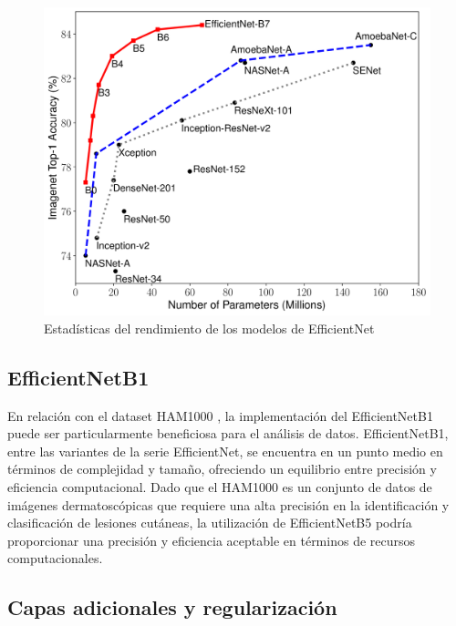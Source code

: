 \begin{figure}[ht]%
   \begin{center}
   \includegraphics[width=1\textwidth]{./Graphics/efficientnet_performance.png}
   \caption{Estadísticas del rendimiento de los modelos de EfficientNet}
   \label{fig:efficientnet_performance}
   \end{center}
   \end{figure}

\subsection{EfficientNetB1}

En relación con el dataset HAM1000 , la implementación del EfficientNetB1 puede ser particularmente beneficiosa para el análisis de datos. EfficientNetB1, entre las variantes de la serie EfficientNet, se encuentra en un punto medio en términos de complejidad y tamaño, ofreciendo un equilibrio entre precisión y eficiencia computacional. Dado que el HAM1000 es un conjunto de datos de imágenes dermatoscópicas que requiere una alta precisión en la identificación y clasificación de lesiones cutáneas, la utilización de EfficientNetB5 podría proporcionar una precisión y eficiencia aceptable en términos de recursos computacionales.

\subsection{Capas adicionales y regularización}

